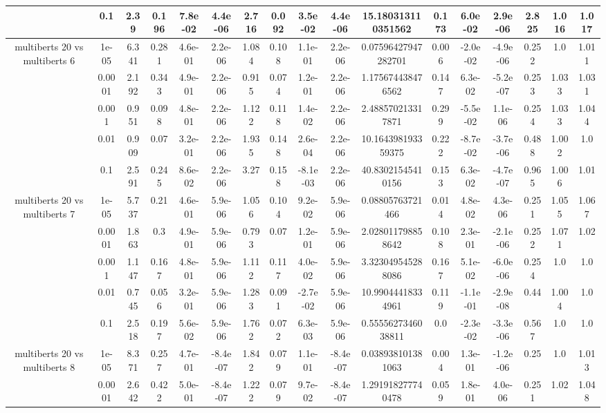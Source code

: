 \begin{tabular}{|c|c|c|c|c|c|c|c|c|c|c|c|c|c|c|c|c|}
 & 0.1 & 2.39 & 0.196 & 7.8e-02 & 4.4e-06 & 2.716 & 0.092 & 3.5e-02 & 4.4e-06 & 15.180313110351562 & 0.173 & 6.0e-02 & 2.9e-06 & 2.825 & 1.016 & 1.017 \\
\hline
\multirow{5}{*}{multiberts 20 vs multiberts 6} & 1e-05 & 6.341 & 0.281 & 4.6e-01 & 2.2e-06 & 1.084 & 0.108 & 1.1e-01 & 2.2e-06 & 0.07596427947282701 & 0.006 & -2.0e-02 & -4.9e-06 & 0.252 & 1.0 & 1.011 \\
 & 0.0001 & 2.192 & 0.343 & 4.9e-01 & 2.2e-06 & 0.915 & 0.074 & 1.2e-01 & 2.2e-06 & 1.175674438476562 & 0.147 & 6.3e-02 & -5.2e-07 & 0.253 & 1.033 & 1.031 \\
 & 0.001 & 0.951 & 0.098 & 4.8e-01 & 2.2e-06 & 1.122 & 0.118 & 1.4e-02 & 2.2e-06 & 2.488570213317871 & 0.299 & -5.5e-02 & 1.1e-06 & 0.254 & 1.033 & 1.044 \\
 & 0.01 & 0.909 & 0.07 & 3.2e-01 & 2.2e-06 & 1.935 & 0.148 & 2.6e-04 & 2.2e-06 & 10.164398193359375 & 0.222 & -8.7e-02 & -3.7e-06 & 0.488 & 1.002 & 1.0 \\
 & 0.1 & 2.591 & 0.245 & 8.6e-02 & 2.2e-06 & 3.27 & 0.158 & -8.1e-03 & 2.2e-06 & 40.83021545410156 & 0.153 & 6.3e-02 & -4.7e-07 & 0.965 & 1.006 & 1.01 \\
\hline
\multirow{5}{*}{multiberts 20 vs multiberts 7} & 1e-05 & 5.737 & 0.21 & 4.6e-01 & 5.9e-06 & 1.056 & 0.104 & 9.2e-02 & 5.9e-06 & 0.08805763721466 & 0.014 & 4.8e-02 & 4.3e-06 & 0.251 & 1.055 & 1.067 \\
 & 0.0001 & 1.863 & 0.3 & 4.9e-01 & 5.9e-06 & 0.793 & 0.07 & 1.2e-01 & 5.9e-06 & 2.028011798858642 & 0.108 & 2.3e-01 & -2.1e-06 & 0.252 & 1.071 & 1.02 \\
 & 0.001 & 1.147 & 0.167 & 4.8e-01 & 5.9e-06 & 1.112 & 0.117 & 4.0e-02 & 5.9e-06 & 3.323049545288086 & 0.167 & 5.1e-02 & -6.0e-06 & 0.254 & 1.0 & 1.0 \\
 & 0.01 & 0.745 & 0.056 & 3.2e-01 & 5.9e-06 & 1.283 & 0.091 & -2.7e-02 & 5.9e-06 & 10.99044418334961 & 0.119 & -1.1e-01 & -2.9e-08 & 0.44 & 1.004 & 1.0 \\
 & 0.1 & 2.518 & 0.197 & 5.6e-02 & 5.9e-06 & 1.762 & 0.072 & 6.3e-03 & 5.9e-06 & 0.5555627346038811 & 0.0 & -2.3e-02 & -3.3e-06 & 0.567 & 1.0 & 1.0 \\
\hline
\multirow{5}{*}{multiberts 20 vs multiberts 8} & 1e-05 & 8.371 & 0.257 & 4.7e-01 & -8.4e-07 & 1.842 & 0.079 & 1.1e-01 & -8.4e-07 & 0.038938101381063 & 0.004 & 1.3e-01 & -1.2e-06 & 0.25 & 1.0 & 1.013 \\
 & 0.0001 & 2.642 & 0.422 & 5.0e-01 & -8.4e-07 & 1.222 & 0.079 & 9.7e-02 & -8.4e-07 & 1.291918277740478 & 0.059 & 1.8e-01 & 4.0e-06 & 0.251 & 1.02 & 1.048 \\

\end{tabular}
